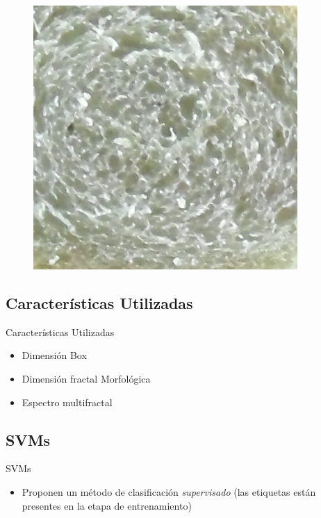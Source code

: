 \documentclass{beamer}
\begin{document}
\begin{frame}
\begin{itemize}
\begin{figure}
\includegraphics[scale=0.2]{../imagenes/camera/b}
\end{figure}


\end{itemize}
\end{frame}

\subsection{Caracter\'isticas Utilizadas}
\begin{frame}
{\huge Caracter\'isticas Utilizadas}
\begin{itemize}
\item Dimensi\'on Box
\item Dimensi\'on fractal Morfol\'ogica
\item Espectro multifractal
\end{itemize}
\end{frame}


\subsection{SVMs}
\begin{frame}
{\huge SVMs}
\begin{center}
\begin{itemize}
\item Proponen un m\'etodo de clasificaci\'on {\em supervisado} (las etiquetas est\'an presentes en la etapa de entrenamiento)
\end{itemize}

\end{center}
\end{frame}
\end{document}
